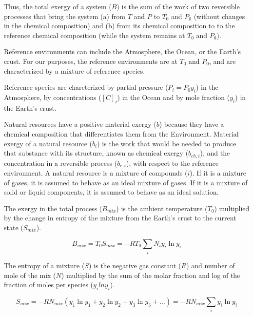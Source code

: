 \documentclass[energies,article,submit,pdftex,moreauthors]{Definitions/mdpi}
\begin{document}
Thus, the total exergy of a system ($B$)
is the sum of the work of two reversible processes
that bring the system
(a) from $T$ and $P$ to
$T_{0}$ and $P_{0}$
(without changes in the chemical composition) and
(b) from its chemical composition to
to the reference chemical composition
(while the system remains at $T_{0}$ and $P_{0}$).


Reference environments can include the Atmosphere,
the Ocean, or the Earth's crust.
For our purposes,
the reference environments are at $T_{0}$ and $P_{0}$,
and are characterized by a mixture of reference species.

Reference species are charcterized by partial pressure
($P_{i} = P_{0} y_{i}$) in the Atmosphere,
by concentrations ($[C]_{i}$) in the Ocean
and by mole fraction ($y_{i}$)
in the Earth's crust.


Natural resources have a positive material exergy ($b$)
because they have a chemical composition
that differentiates them from the Environment.
Material exergy of a natural resource ($b_{i}$)
is the work that would be needed
to produce that substance with its structure,
known as chemical exergy ($b_{ch,i}$),
and the concentration in a reversible process ($b_{c,i}$),
with respect to the reference environment.
A natural resource is a mixture of compounds ($i$).
If it is a mixture of gases,
it is assumed to behave as an ideal mixture of gases.
If it is a mixture of solid or liquid components,
it is assumed to behave as an ideal solution.

The exergy in the total process ($B_{mix}$) is the ambient temperature ($T_{0}$) multiplied by the change
in entropy of the mixture from the Earth's crust to the current state ($S_{mix}$).

\begin{equation}\label{eq:specific_exergy_of_mixture_definition1}
  B_{mix} = T_{0}S_{mix} = -RT_{0}\sum_{i}{N_{i}{y_{i}}\ln{y_{i}}}
\end{equation}

The entropy of a mixture ($S$) is the negative gas constant ($R$)
and number of mole of the mix ($N$)
multiplied by the sum of the molar fraction
and log of the fraction of moles per species ($y_i$$lny_i$).

\begin{equation}\label{eq:specific_entropy_of_mixture_definition}
  S_{mix} = -RN_{mix}(y_{1}\ln{y_{1}} + y_{2}\ln{y_{2}} + y_{3}\ln{y_{3}} + \ldots)
          = -RN_{mix}\sum_{i} y_{i}\ln{y_{i}}
\end{equation}
\end{document}
